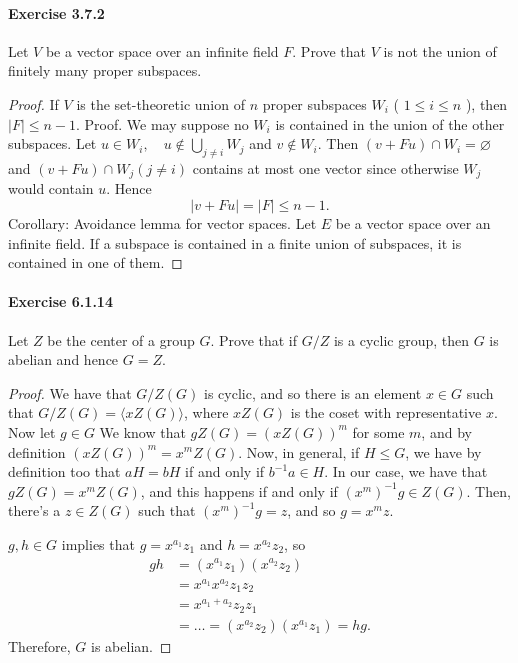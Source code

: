 \documentclass{article}
\begin{document}
\paragraph{Exercise 3.7.2} Let $V$ be a vector space over an infinite field $F$. Prove that $V$ is not the union of finitely many proper subspaces.
\begin{proof}
    If $V$ is the set-theoretic union of $n$ proper subspaces $W_i$ ( $1 \leq i \leq n$ ), then $|F| \leq n-1$.
Proof. We may suppose no $W_i$ is contained in the union of the other subspaces. Let $u \in W_i, \quad u \notin \bigcup_{j \neq i} W_j$ and $v \notin W_i$.
Then $(v+F u) \cap W_i=\varnothing$ and $(v+F u) \cap W_j(j \neq i)$ contains at most one vector since otherwise $W_j$ would contain $u$. Hence
$$
|v+F u|=|F| \leq n-1 .
$$
Corollary: Avoidance lemma for vector spaces.
Let $E$ be a vector space over an infinite field. If a subspace is contained in a finite union of subspaces, it is contained in one of them.
\end{proof}



\paragraph{Exercise 6.1.14} Let $Z$ be the center of a group $G$. Prove that if $G / Z$ is a cyclic group, then $G$ is abelian and hence $G=Z$.
\begin{proof}
    We have that $G / Z(G)$ is cyclic, and so there is an element $x \in G$ such that $G / Z(G)=\langle x Z(G)\rangle$, where $x Z(G)$ is the coset with representative $x$. Now let $g \in G$
We know that $g Z(G)=(x Z(G))^m$ for some $m$, and by definition $(x Z(G))^m=x^m Z(G)$.
Now, in general, if $H \leq G$, we have by definition too that $a H=b H$ if and only if $b^{-1} a \in H$.
In our case, we have that $g Z(G)=x^m Z(G)$, and this happens if and only if $\left(x^m\right)^{-1} g \in Z(G)$.
Then, there's a $z \in Z(G)$ such that $\left(x^m\right)^{-1} g=z$, and so $g=x^m z$.

$g, h \in G$ implies that $g=x^{a_1} z_1$ and $h=x^{a_2} z_2$, so
$$
\begin{aligned}
g h & =\left(x^{a_1} z_1\right)\left(x^{a_2} z_2\right) \\
& =x^{a_1} x^{a_2} z_1 z_2 \\
& =x^{a_1+a_2} z_2 z_1 \\
& =\ldots=\left(x^{a_2} z_2\right)\left(x^{a_1} z_1\right)=h g .
\end{aligned}
$$
Therefore, $G$ is abelian.
\end{proof}
\end{document}
